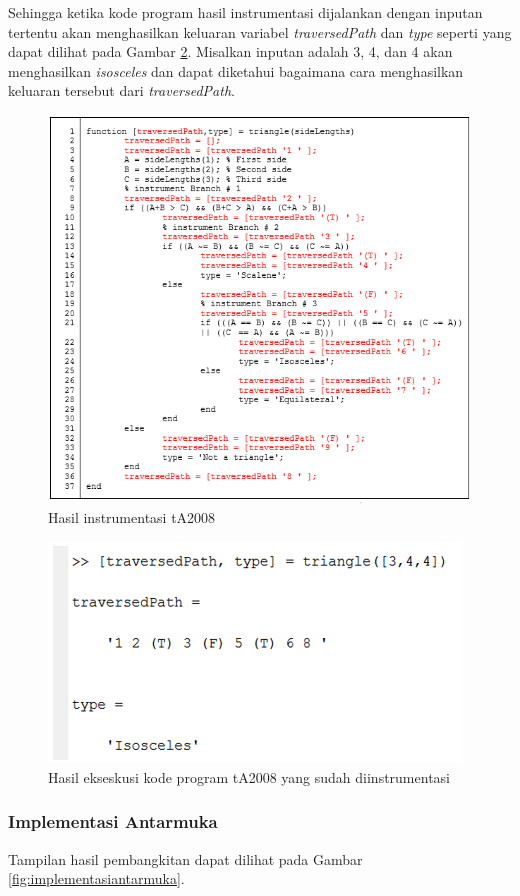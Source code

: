 Sehingga ketika kode program hasil instrumentasi dijalankan dengan inputan tertentu akan menghasilkan keluaran variabel \textit{traversedPath} dan \textit{type} seperti yang dapat dilihat pada Gambar \ref{fig:hasilekseskusi}. Misalkan inputan adalah 3, 4, dan 4 akan menghasilkan \textit{isosceles} dan dapat diketahui bagaimana cara menghasilkan keluaran tersebut dari \textit{traversedPath}. 
\begin{figure}[h!]
	\centering
	\includegraphics[width=0.95\linewidth]{gambar/instrumentasi}
	\caption{Hasil instrumentasi tA2008}
	\label{fig:instrumentasi}
\end{figure}
\begin{figure}
	\centering
	\includegraphics[width=0.7\linewidth]{gambar/hasilekseskusi}
	\caption{Hasil ekseskusi kode program tA2008 yang sudah diinstrumentasi}
	\label{fig:hasilekseskusi}
\end{figure}

\subsubsection*{Implementasi Antarmuka}
Tampilan hasil pembangkitan dapat dilihat pada Gambar \ref{fig:implementasiantarmuka}.

